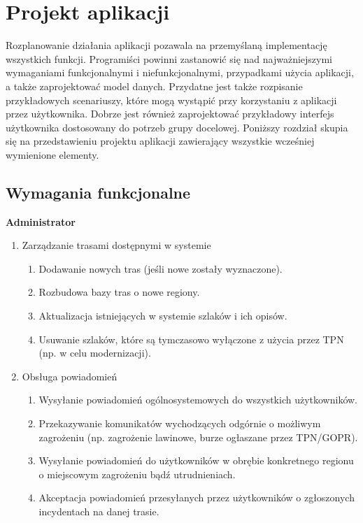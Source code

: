 \section{Projekt aplikacji} 
Rozplanowanie działania aplikacji pozawala na przemyślaną implementację wszystkich funkcji. Programiści powinni zastanowić się nad najważniejszymi wymaganiami funkcjonalnymi i niefunkcjonalnymi, przypadkami użycia aplikacji, a także zaprojektować model danych. Przydatne jest także rozpisanie przykładowych scenariuszy, które mogą wystąpić przy korzystaniu z aplikacji przez użytkownika. Dobrze jest również zaprojektować przykładowy interfejs użytkownika dostosowany do potrzeb grupy docelowej. Poniższy rozdział skupia się na przedstawieniu projektu aplikacji zawierający wszystkie wcześniej wymienione elementy.

    \subsection{Wymagania funkcjonalne}
    \textbf{Administrator}
    \begin{enumerate}
        \item Zarządzanie trasami dostępnymi w systemie
        \begin{enumerate}
            \item Dodawanie nowych tras (jeśli nowe zostały wyznaczone).
            \item Rozbudowa bazy tras o nowe regiony.
            \item Aktualizacja istniejących w systemie szlaków i ich opisów.
            \item Usuwanie szlaków, które są tymczasowo wyłączone z użycia przez TPN (np. w celu modernizacji).
        \end{enumerate}
        \item Obsługa powiadomień
        \begin{enumerate}
            \item Wysyłanie powiadomień ogólnosystemowych do wszystkich użytkowników.
            \item Przekazywanie komunikatów wychodzących odgórnie o możliwym zagrożeniu (np. zagrożenie lawinowe, burze ogłaszane przez TPN/GOPR).
            \item Wysyłanie powiadomień do użytkowników w obrębie konkretnego regionu o miejscowym zagrożeniu bądź utrudnieniach.
            \item Akceptacja powiadomień przesyłanych przez użytkowników o zgłoszonych incydentach na danej trasie.
        \end{enumerate}
    \end{enumerate}
